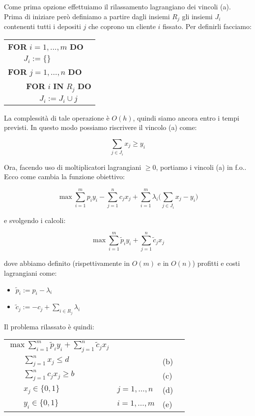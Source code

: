 \documentclass[11pt]{book}
\begin{document}
Come prima opzione effettuiamo il rilassamento lagrangiano dei vincoli
(a). Prima di iniziare per\`o definiamo a partire dagli insiemi $R_j$
gli insiemi $J_i$ contenenti tutti i depositi $j$ che coprono un
cliente $i$ fissato. Per definirli facciamo:

\vspace{20pt}
\begin{tabular}{l}
\textbf{FOR} $i=1,\dots,m$ \textbf{DO}\\
$\qquad J_i := \{\}$\\
\textbf{FOR} $j=1,\dots,n$ \textbf{DO}\\
$\qquad$ \textbf{FOR} $i$ \textbf{IN} $R_j$ \textbf{DO}\\
$\qquad\qquad J_i := J_i \cup j$
\end{tabular}
\vspace{20pt}

La complessit\`a di tale operazione \`e $O(h)$, quindi siamo ancora
entro i tempi previsti. In questo modo possiamo riscrivere il vincolo
(a) come:

$$
\sum\limits_{j \in J_i} x_j \geq y_i
$$

Ora, facendo uso di moltiplicatori lagrangiani $\geq 0$, portiamo i
vincoli (a) in f.o.. Ecco come cambia la funzione obiettivo:

$$
\max \sum\limits_{i=1}^m p_iy_i - \sum\limits_{j=1}^n c_jx_j +
\sum\limits_{i=1}^m \lambda_i \Bigr ( \sum\limits_{j \in J_i} x_j -
y_i \Bigr )
$$

e svolgendo i calcoli:

$$
\max \sum\limits_{i=1}^m \tilde{p}_iy_i + \sum\limits_{j=1}^n \tilde{c}_jx_j
$$

dove abbiamo definito (rispettivamente in $O(m)$ e in $O(n)$) profitti
e costi lagrangiani come:

\begin{itemize}
\item $\tilde{p}_i := p_i - \lambda_i $
\item $\tilde{c}_j := -c_j + \sum\limits_{i \in R_j} \lambda_i$
\end{itemize}

Il problema rilassato \`e quindi:

\begin{center}
\begin{tabular}{llp{1cm}l}
$\max \sum\limits_{i=1}^m \tilde{p}_iy_i + \sum\limits_{j=1}^n \tilde{c}_jx_j$\\
$\qquad \sum\limits_{j=1}^n x_j \leq d$ & & (b) \\
$\qquad \sum\limits_{j=1}^n c_jx_j \geq b$ & & (c) \\
$\qquad x_j \in \{0,1\}$ & $j=1,\dots,n$ & (d) \\
$\qquad y_i \in \{0,1\}$ & $i=1,\dots,m$ & (e) \\
\end{tabular}
\end{center}
\end{document}
